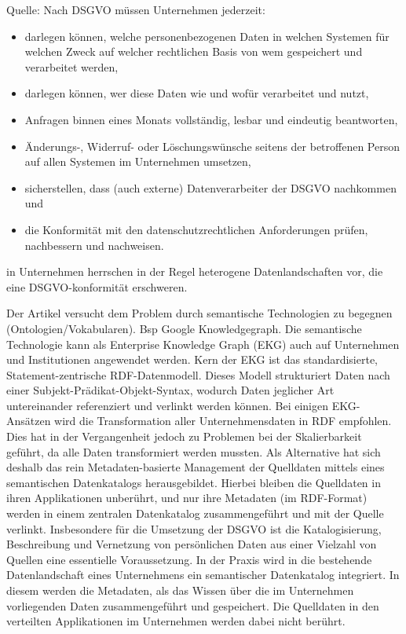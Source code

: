 Quelle: \cite{Brockmann2018}
Nach DSGVO müssen Unternehmen jederzeit: 
\begin{itemize}
\item	darlegen können, welche personenbezogenen Daten in welchen
Systemen für welchen Zweck auf welcher rechtlichen Basis von
wem gespeichert und verarbeitet werden,
\item darlegen können, wer diese Daten wie und wofür verarbeitet
und nutzt,
\item Anfragen binnen eines Monats vollständig, lesbar und eindeutig
beantworten,
\item Änderungs-, Widerruf- oder Löschungswünsche seitens der
betroffenen Person auf allen Systemen im Unternehmen umsetzen,
\item sicherstellen, dass (auch externe) Datenverarbeiter der DSGVO
nachkommen und
\item die Konformität mit den datenschutzrechtlichen Anforderungen
prüfen, nachbessern und nachweisen.

\end{itemize}

in Unternehmen herrschen in der Regel heterogene Datenlandschaften vor, die eine DSGVO-konformität erschweren.

Der Artikel versucht dem Problem durch semantische Technologien zu begegnen (Ontologien/Vokabularen). Bsp Google Knowledgegraph.
Die semantische Technologie kann als Enterprise Knowledge
Graph (EKG) auch auf Unternehmen und Institutionen angewendet
werden.
Kern der EKG ist das standardisierte, Statement-zentrische
RDF-Datenmodell. Dieses Modell strukturiert Daten nach einer
Subjekt-Prädikat-Objekt-Syntax, wodurch Daten jeglicher Art
untereinander referenziert und verlinkt werden können.
Bei einigen EKG-Ansätzen wird die Transformation aller Unternehmensdaten
in RDF empfohlen. Dies hat in der Vergangenheit
jedoch zu Problemen bei der Skalierbarkeit geführt, da alle
Daten transformiert werden mussten. Als Alternative hat sich
deshalb das rein Metadaten-basierte Management der Quelldaten
mittels eines semantischen Datenkatalogs herausgebildet. Hierbei
bleiben die Quelldaten in ihren Applikationen unberührt,
und nur ihre Metadaten (im RDF-Format) werden in einem zentralen
Datenkatalog zusammengeführt und mit der Quelle verlinkt.
Insbesondere für die Umsetzung der DSGVO ist die Katalogisierung,
Beschreibung und Vernetzung von persönlichen Daten
aus einer Vielzahl von Quellen eine essentielle Voraussetzung.
In der Praxis wird in die bestehende Datenlandschaft eines
Unternehmens ein semantischer Datenkatalog integriert. In diesem
werden die Metadaten, als das Wissen über die im Unternehmen
vorliegenden Daten zusammengeführt und gespeichert.
Die Quelldaten in den verteilten Applikationen im Unternehmen
werden dabei nicht berührt.

